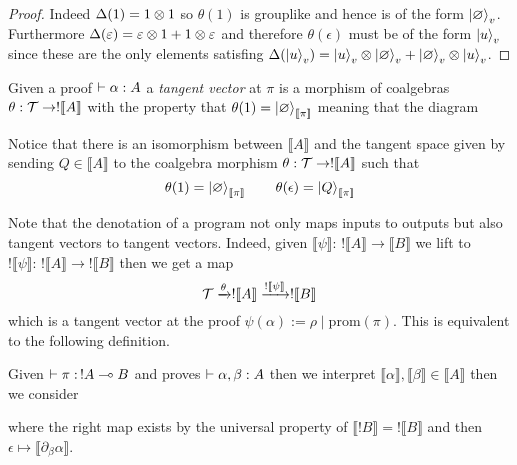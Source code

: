 \documentclass[12pt]{article}
\newcommand{\br}[1]{\llbracket #1 \rrbracket}
\begin{document}
\begin{proof}
Indeed $\Delta(1) = 1 \otimes 1$ so $\theta(1)$ is grouplike and hence is of the form $\left| \varnothing \right>_v$. Furthermore $\Delta(\varepsilon) = \varepsilon \otimes 1 + 1 \otimes \varepsilon$ and therefore $\theta(\epsilon)$ must be of the form $\left| u \right>_{v}$ since these are the only elements satisfing $\Delta(\left| u \right>_v) = \left| u \right>_v \otimes \left| \varnothing \right>_v + \left| \varnothing \right>_v \otimes \left| u \right>_v$.
\end{proof}


\begin{defn}
Given a proof $\vdash \alpha : A$ a \textit{tangent vector} at $\pi$ is a morphism of coalgebras $\theta : \T \to ! \br{A}$ with the property that $\theta(1) = \ket{\empty}_{\br{\pi}}$ meaning that the diagram
\begin{center}
\end{center}
Notice that there is an isomorphism between $\br{A}$ and the tangent space given by sending $Q \in \br{A}$ to the coalgebra morphism $\theta : \T \to ! \br{A}$ such that
\[ \theta(1) = \ket{\empty}_{\br{\pi}} \quad \quad \theta(\epsilon) = \ket{Q}_{\br{\pi}} \]
\end{defn}

Note that the denotation of a program not only maps inputs to outputs but also tangent vectors to tangent vectors. Indeed, given $\br{\psi} : \, ! \br{A} \to \br{B}$ we lift to $! \br{\psi} : \, ! \br{A} \to ! \br{B}$ then we get a map
\[ \T \xrightarrow{\theta} ! \br{A} \xrightarrow{! \br{\psi}} ! \br{B} \]
which is a tangent vector at the proof $\psi(\alpha) := \rho \mid \text{prom}(\pi)$. This is equivalent to the following definition.

\begin{defn}
Given $\vdash \pi : \, ! A \multimap B$ and proves $\vdash \alpha, \beta : A$ then we interpret $\br{\alpha}, \br{\beta} \in \br{A}$ then we consider
\begin{center}
\end{center}
where the right map exists by the universal property of $\br{! B} = ! \br{B}$ and then $\epsilon \mapsto \br{\partial_\beta \alpha}$.
\end{defn}
\end{document}
